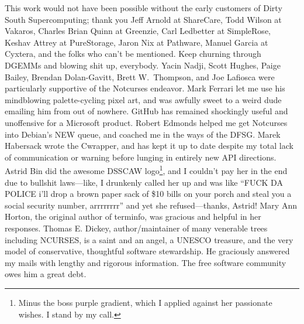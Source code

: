 \documentclass[letterpaper,10pt]{article}
\newcommand\CC{C\nolinebreak\hspace{-.05em}\raisebox{.4ex}{\relsize{-3}{\textbf{+}}}\nolinebreak\hspace{-.10em}\raisebox{.4ex}{\relsize{-3}{\textbf{+}}}\hspace{.2em}}
\begin{document}
This work would not have been possible without the early customers of
Dirty South Supercomputing; thank you Jeff Arnold at ShareCare,
Todd Wilson at Vakaros, Charles Brian Quinn at Greenzie, Carl Ledbetter
at SimpleRose, Keshav Attrey at PureStorage, Jaron Nix at Pathware,
Manuel Garcia at Cyxtera, and the folks who can't be mentioned. Keep
churning through DGEMMs and blowing shit up, everybody. Yacin Nadji,
Scott Hughes, Paige Bailey, Brendan Dolan-Gavitt, Brett W.\ Thompson, and Joe
Lafiosca were particularly supportive of the Notcurses endeavor. Mark Ferrari
let me use his mindblowing palette-cycling pixel art, and was awfully sweet to
a weird dude emailing him from out of nowhere. GitHub has remained shockingly
useful and unoffensive for a Microsoft product. Robert Edmonds helped me get
Notcurses into Debian's NEW queue, and coached me in the ways of the DFSG.
Marek Habersack wrote the \CC wrapper, and has kept it up to date despite my
total lack of communication or warning before lunging in entirely new API
directions. Astrid Bin did the awesome DSSCAW logo\footnote{Minus the boss
purple gradient, which I applied against her passionate wishes. I stand by my
call.}, and I couldn't pay her in the end due to bullshit laws---like, I
drunkenly called her up and was like ``FUCK DA POLICE i'll drop a brown paper
sack of \$10 bills on your porch and steal you a social security number,
arrrrrrrr'' and yet she refused---thanks, Astrid! Mary Ann Horton, the original
author of terminfo, was gracious and helpful in her responses. Thomas E. Dickey,
author/maintainer of many venerable trees including NCURSES, is a saint and an
angel, a UNESCO treasure, and the very model of conservative, thoughtful
software stewardship. He graciously answered my mails with lengthy and rigorous
information. The free software community owes him a great debt.
\end{document}
